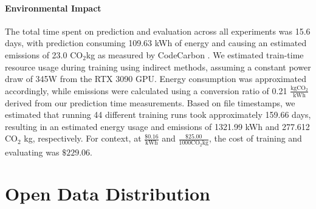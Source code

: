 \documentclass{article}
\newcommand{\cotwo}{\ensuremath{\mathrm{CO_2}}}
\begin{document}
\paragraph{Environmental Impact} The total time spent on prediction and evaluation across all experiments was 15.6 days, with prediction
  consuming 109.63 kWh of energy and causing an estimated emissions of 23.0 \cotwo kg as measured by
  CodeCarbon \cite{lacoste2019codecarbon}.
We estimated train-time resource usage during training using indirect methods, assuming a constant power
  draw of 345W from the RTX 3090 GPU.
Energy consumption was approximated accordingly, while emissions were calculated using a conversion
  ratio of 0.21 $\frac{\textrm{kg}\cotwo{}}{\textrm{kWh}}$ derived from our prediction time measurements.
Based on file timestamps, we estimated that running 44 different training runs took approximately 159.66
  days, resulting in an estimated energy usage and emissions of 1321.99 kWh and 277.612 $\cotwo$ kg,
  respectively.
For context, at $\frac{\$0.16}{\textrm{kWh}}$ and $\frac{\$25.00}{1000 \cotwo \textrm{kg}}$, the cost of training
  and evaluating was $\$229.06$.

\begin{comment}
import pint
reg = pint.UnitRegistry()
reg.define('CO2 = []')
reg.define('dollar = []')
kwh = reg.Unit('kilowatt/hour')
energy_cost = 0.16 * reg.dollar / (kwh)
emission_cost = 25 * reg.dollar / (1000 * reg.CO2 * reg.metric_ton)
energy = 1321.99 * kwh
emission = 277.612 * reg.CO2 * reg.kg
train = (energy * energy_cost + emission * emission_cost)

energy = 109.63 * kwh
emission = 23 * reg.CO2 * reg.kg
eval = (energy * energy_cost + emission * emission_cost)

train + eval
\end{comment}
  




\section{Open Data Distribution}
\label{sec:distribution}
\end{document}
